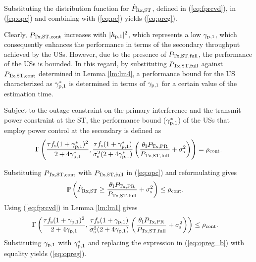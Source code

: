 \begin{IEEEproof}
Substituting the distribution function for $\hat{P}_{\text{Rx,ST}}$, defined in (\ref{eq:fprcvd}), in (\ref{eq:opc}) and combining with (\ref{eq:pc}) yields (\ref{eq:preg}).
\end{IEEEproof}
Clearly, $P_{\text{Tx,ST,cont}}$ increases with $|h_{\text{p,1}}|^2$, which represents a low ${\gamma}_{\text{p,1}}$, which consequently enhances the performance in terms of the secondary throughput achieved by the USs. However, due to the presence of $P_{\text{Tx,ST,full}}$, the performance of the USs is bounded. In this regard, by substituting $P_{\text{Tx,ST,full}}$ against $P_{\text{Tx,ST,cont}}$ determined in Lemma \ref{lm:lm4}, a performance bound for the US characterized as ${\gamma}_{\text{p,1}}^*$ is determined in terms of ${\gamma}_{\text{p,1}}$ for a certain value of the estimation time. 
\begin{coro} \label{cor:cor1}
\normalfont
Subject to the outage constraint on the primary interference and the transmit power constraint at the ST, the performance bound (${\gamma}_{\text{p,1}}^*$) of the USs that employ power control at the secondary is defined as %
\begin{align}
\Gamma\left(\frac{\tau f_{\text{s}} (1 + {\gamma}_{\text{p,1}}^*)^2}{2 + 4 {\gamma}_{\text{p,1}}^*}, \frac{\tau f_{\text{s}} (1  + {\gamma}_{\text{p,1}}^*)}{\sigma^2_{\text{s}} (2 + 4 {\gamma}_{\text{p,1}}^*)} \left( \frac{\theta_{\text{I}} P_{\text{Tx,PR}}}{P_{\text{Tx,ST,full}}} + \sigma^2_{\text{s}}  \right)  \right) = \rho_{\text{cont}}. \label{eq:opreg}  
\end{align}
\end{coro}
\begin{IEEEproof}
Substituting $P_{\text{Tx,ST,cont}}$ with $P_{\text{Tx,ST,full}}$ in (\ref{eq:opc}) and reformulating gives 
\begin{align}
\mathbb P\left( \hat{P}_{\text{Rx,ST}} \ge \frac{\theta_{\text{I}} P_{\text{Tx,PR}}}{P_{\text{Tx,ST,full}}} + \sigma^2_{\text{s}} \right) &\le \rho_{\text{cont}}. \label{eq:opreg_a} 
\end{align}
Using (\ref{eq:fprcvd}) in Lemma \ref{lm:lm1} gives
\begin{align}
\Gamma\left(\frac{\tau f_{\text{s}} (1 + {\gamma}_{\text{p,1}})^2}{2 + 4 {\gamma}_{\text{p,1}}}, \frac{\tau f_{\text{s}} (1  + {\gamma}_{\text{p,1}})}{\sigma^2_{\text{s}} (2 + 4 {\gamma}_{\text{p,1}})} \left( \frac{\theta_{\text{I}} P_{\text{Tx,PR}}}{P_{\text{Tx,ST,full}}} + \sigma^2_{\text{s}}  \right)  \right) &\le \rho_{\text{cont}}. \label{eq:opreg_b} 
\end{align}
Substituting ${\gamma}_{\text{p,1}}$ with ${\gamma}_{\text{p,1}}^*$ and replacing the expression in (\ref{eq:opreg_b}) with equality yields (\ref{eq:opreg}). 
\end{IEEEproof}
